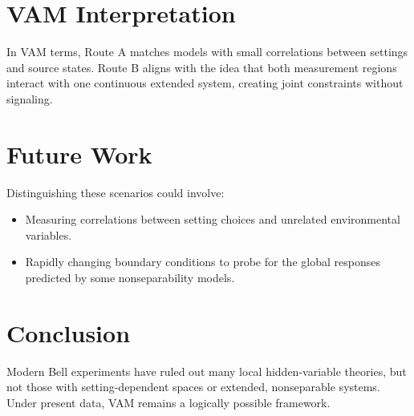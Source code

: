 \documentclass[twocolumn,aps,pre,floatfix,nofootinbib]{revtex4-2}
\begin{document}
\section{VAM Interpretation}
In VAM terms, Route A matches models with small correlations between settings and source states. Route B aligns with the idea that both measurement regions interact with one continuous extended system, creating joint constraints without signaling.

\section{Future Work}
Distinguishing these scenarios could involve:
\begin{itemize}
    \item Measuring correlations between setting choices and unrelated environmental variables.
    \item Rapidly changing boundary conditions to probe for the global responses predicted by some nonseparability models.
\end{itemize}

\section{Conclusion}
Modern Bell experiments have ruled out many local hidden-variable theories, but not those with setting-dependent spaces or extended, nonseparable systems. Under present data, VAM remains a logically possible framework.
\end{document}
